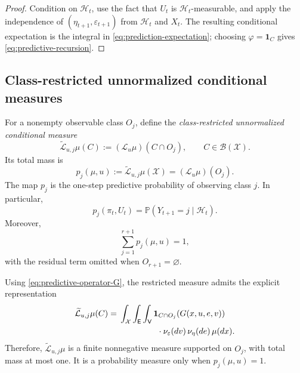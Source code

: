 \documentclass[10pt,twocolumn]{article}
\theoremstyle{remark}
\newcommand{\Pp}{\mathbb{P}}
\newcommand{\B}{\mathcal{B}}
\newcommand{\Hh}{\mathcal{H}}
\newcommand{\Xcal}{\mathcal{X}}
\newcommand{\one}{\mathbf{1}}
\begin{document}
\begin{proof}
	Condition on \(\Hh_t\), use the fact that \(U_t\) is \(\Hh_t\)-measurable, and apply the independence of \((\eta_{t+1},\varepsilon_{t+1})\) from \(\Hh_t\) and \(X_t\). The resulting conditional expectation is the integral in \cref{eq:prediction-expectation}; choosing \(\varphi=\one_C\) gives \cref{eq:predictive-recursion}.
\end{proof}

\subsection{Class-restricted unnormalized conditional measures}
\label{subsec:class-restricted-measures}

For a nonempty observable class \(O_j\), define the \emph{class-restricted unnormalized conditional measure}
\begin{equation}
	\widetilde{\mathcal L}_{u,j}\mu(C)
	:=
	(\mathcal L_u\mu)(C\cap O_j),
	\qquad C\in\B(\Xcal).
	\label{eq:class-restricted-measure}
\end{equation}
Its total mass is
\begin{equation}
	p_j(\mu,u)
	:=
	\widetilde{\mathcal L}_{u,j}\mu(\Xcal)
	=
	(\mathcal L_u\mu)(O_j).
	\label{eq:class-predictive-probability}
\end{equation}
The map \(p_j\) is the one-step predictive probability of observing class \(j\). In particular,
\begin{equation*}
	p_j(\pi_t,U_t)
	=\Pp(Y_{t+1}=j\mid\Hh_t).
	\label{eq:observation-predictive-probability}
\end{equation*}
Moreover,
\begin{equation*}
	\sum_{j=1}^{r+1}p_j(\mu,u)=1,
	\label{eq:class-probabilities-sum}
\end{equation*}
with the residual term omitted when \(O_{r+1}=\varnothing\).

Using \cref{eq:predictive-operator-G}, the restricted measure admits the explicit representation
\begin{equation*}
	\begin{split}
		\widetilde{\mathcal L}_{u,j}\mu(C)
		={}&\int_{\Xcal}\int_{\mathsf E}\int_{\mathsf V}
		\one_{C\cap O_j}\!\left(G(x,u,e,v)\right)
		\\
		&\hspace{1.6cm}\cdot
		\nu_\varepsilon(dv)\,\nu_\eta(de)\,\mu(dx).
	\end{split}
	\label{eq:class-restricted-G}
\end{equation*}
Therefore, \(\widetilde{\mathcal L}_{u,j}\mu\) is a finite nonnegative measure supported on \(O_j\), with total mass at most one. It is a probability measure only when \(p_j(\mu,u)=1\).
\end{document}
